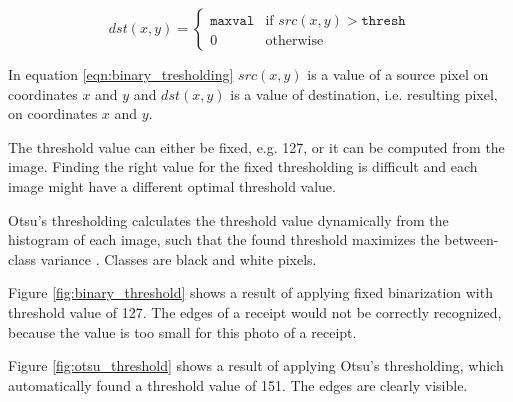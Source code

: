 \documentclass[
  digital, %
  table,   %
  oneside, %
  lof,     %
  lot,     %
]{fithesis3}
\begin{document}
\begin{equation}
\label{eqn:binary_tresholding}
dst(x,y) = \begin{cases}
            \texttt{maxval} & \text{if }src(x,y) > \texttt{thresh}\\
                0 & \text{otherwise}
          \end{cases}
\end{equation}

In equation \ref{eqn:binary_tresholding} $src(x,y)$ is a value of a source pixel on coordinates $x$ and $y$ and $dst(x,y)$ is a value of destination, i.e. resulting pixel, on coordinates $x$ and $y$.

The threshold value can either be fixed, e.g. 127, or it can be computed from the image. Finding the right value for the fixed thresholding is difficult and each image might have a different optimal threshold value. 

Otsu's thresholding calculates the threshold value dynamically from the histogram of each image, such that the found threshold maximizes the between-class variance \cite{gonzalez08}. Classes are black and white pixels.

Figure \ref{fig:binary_threshold} shows a result of applying fixed binarization with threshold value of 127. The edges of a receipt would not be correctly recognized, because the value is too small for this photo of a receipt. 

Figure \ref{fig:otsu_threshold} shows a result of applying Otsu's thresholding, which automatically found a threshold value of 151. The edges are clearly visible.
\end{document}
